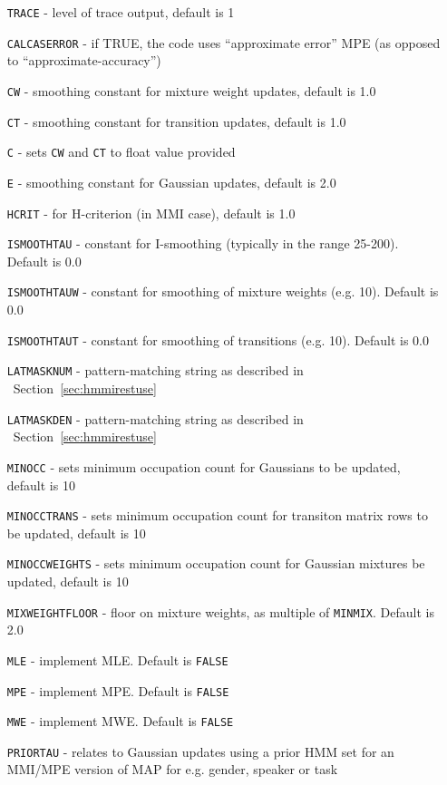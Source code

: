 \begin{itemize}
\item[{\tt TRACE}] - level of trace output, default is 1
\item[{\tt CALCASERROR}] - if TRUE, the code uses ``approximate error'' MPE (as opposed to ``approximate-accuracy'') 
\item[{\tt CW}] - smoothing constant for mixture weight updates, default is 1.0
\item[{\tt CT}] - smoothing constant for transition updates, default is 1.0
\item[{\tt C}] - sets {\tt CW} and {\tt CT} to float value provided
\item[{\tt E}] - smoothing constant for Gaussian updates, default is 2.0
\item[{\tt HCRIT}] - for H-criterion (in MMI case), default is 1.0
\item[{\tt ISMOOTHTAU}] - constant for I-smoothing (typically in the range 25-200).  Default is 0.0
\item[{\tt ISMOOTHTAUW}] - constant for smoothing of mixture weights (e.g. 10).  Default is 0.0
\item[{\tt ISMOOTHTAUT}] - constant for smoothing of transitions (e.g. 10).   Default is 0.0
\item[{\tt LATMASKNUM}]  - pattern-matching string  as described in 
  ~Section~\ref{sec:hmmirestuse} 
\item[{\tt LATMASKDEN}]  - pattern-matching string  as described in 
  ~Section~\ref{sec:hmmirestuse} 
\item[{\tt MINOCC}] - sets minimum occupation count for Gaussians to be updated, default is 10
\item[{\tt MINOCCTRANS}] - sets minimum occupation count for transiton matrix rows to be updated, default is 10
\item[{\tt MINOCCWEIGHTS}] - sets minimum occupation count for Gaussian mixtures be updated, 
         default is 10
\item[{\tt MIXWEIGHTFLOOR}] - floor on mixture weights, as multiple of {\tt MINMIX}. Default is 2.0
\item[{\tt MLE}] - implement MLE.  Default is {\tt FALSE}
\item[{\tt MPE}] - implement MPE.  Default is {\tt FALSE}
\item[{\tt MWE}] - implement MWE.  Default is {\tt FALSE}
\item[{\tt PRIORTAU}] - relates to Gaussian updates using a prior HMM set for an MMI/MPE version of MAP for e.g. gender, speaker or task

\end{itemize}
